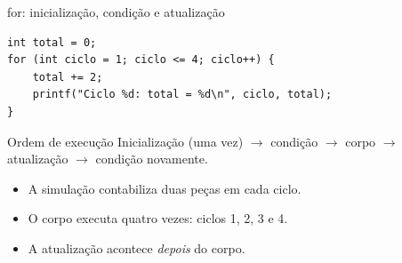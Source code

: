\begin{frame}[fragile]{for: inicialização, condição e atualização}
\begin{lstlisting}
int total = 0;
for (int ciclo = 1; ciclo <= 4; ciclo++) {
    total += 2;
    printf("Ciclo %d: total = %d\n", ciclo, total);
}
\end{lstlisting}
\begin{block}{Ordem de execução}
Inicialização (uma vez) $\to$ condição $\to$ corpo $\to$ atualização $\to$ condição novamente.
\end{block}
\begin{itemize}
\item A simulação contabiliza duas peças em cada ciclo.
\item O corpo executa quatro vezes: ciclos 1, 2, 3 e 4.
\item A atualização acontece \emph{depois} do corpo.
\end{itemize}
\end{frame}
